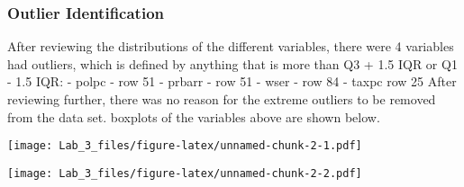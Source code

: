 \documentclass[]{article}
\newenvironment{Shaded}{\begin{snugshade}}{\end{snugshade}}
\newcommand{\KeywordTok}[1]{\textcolor[rgb]{0.13,0.29,0.53}{\textbf{#1}}}
\newcommand{\DataTypeTok}[1]{\textcolor[rgb]{0.13,0.29,0.53}{#1}}
\newcommand{\StringTok}[1]{\textcolor[rgb]{0.31,0.60,0.02}{#1}}
\newcommand{\CommentTok}[1]{\textcolor[rgb]{0.56,0.35,0.01}{\textit{#1}}}
\newcommand{\OperatorTok}[1]{\textcolor[rgb]{0.81,0.36,0.00}{\textbf{#1}}}
\newcommand{\NormalTok}[1]{#1}
\begin{document}
\begin{Shaded}
\end{Shaded}

\subsubsection{Outlier Identification}\label{outlier-identification}

After reviewing the distributions of the different variables, there were
4 variables had outliers, which is defined by anything that is more than
Q3 + 1.5 IQR or Q1 - 1.5 IQR: - polpc - row 51 - prbarr - row 51 - wser
- row 84 - taxpc row 25 After reviewing further, there was no reason for
the extreme outliers to be removed from the data set. boxplots of the
variables above are shown below.

\begin{Shaded}
\end{Shaded}

\texttt{[image: Lab\_3\_files/figure-latex/unnamed-chunk-2-1.pdf]}

\begin{Shaded}
\end{Shaded}

\texttt{[image: Lab\_3\_files/figure-latex/unnamed-chunk-2-2.pdf]}

\begin{Shaded}
\end{Shaded}
\end{document}
